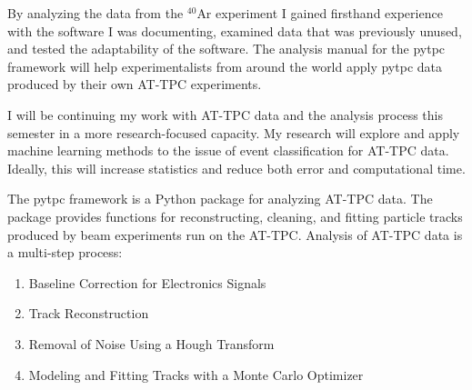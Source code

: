\documentclass[ansiepaper,portrait]{baposter}
\begin{document}
\begin{poster}
{\small{ By analyzing the data from the $^{40}$Ar experiment I gained firsthand experience with the software I was documenting, examined data that was previously unused, and tested the adaptability of the software. The analysis manual for the pytpc framework will help experimentalists from around the world apply pytpc data produced by their own AT-TPC experiments.

I will be continuing my work with AT-TPC data and the analysis process this semester in a more research-focused capacity. My research will explore and apply machine learning methods to the issue of event classification for AT-TPC data. Ideally, this will increase statistics and reduce both error and computational time. }
}
{\small{The pytpc framework is a Python package for analyzing AT-TPC data. The package provides functions for reconstructing, cleaning, and fitting particle tracks produced by beam experiments run on the AT-TPC. Analysis of AT-TPC data is a multi-step process:

\begin{enumerate}\itemsep-0.05em
\item Baseline Correction for Electronics Signals
\item Track Reconstruction
\item Removal of Noise Using a Hough Transform
\item Modeling and Fitting Tracks with a Monte Carlo Optimizer
\end{enumerate}

}}
\end{poster}
\end{document}
